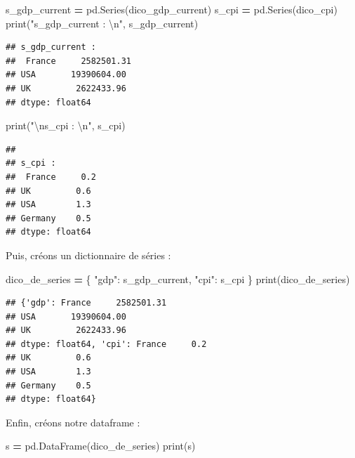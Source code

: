 \documentclass[12pt,]{book}
\newenvironment{Shaded}{\begin{snugshade}}{\end{snugshade}}
\newcommand{\CharTok}[1]{\textcolor[rgb]{0.31,0.60,0.02}{#1}}
\newcommand{\StringTok}[1]{\textcolor[rgb]{0.31,0.60,0.02}{#1}}
\newcommand{\OperatorTok}[1]{\textcolor[rgb]{0.81,0.36,0.00}{\textbf{#1}}}
\newcommand{\BuiltInTok}[1]{#1}
\newcommand{\NormalTok}[1]{#1}
\numberwithin{equation}{section}
\numberwithin{countremarque}{section}
\begin{document}
\begin{Shaded}
\begin{Highlighting}[]
\NormalTok{s_gdp_current }\OperatorTok{=}\NormalTok{ pd.Series(dico_gdp_current)}
\NormalTok{s_cpi }\OperatorTok{=}\NormalTok{ pd.Series(dico_cpi)}
\BuiltInTok{print}\NormalTok{(}\StringTok{"s_gdp_current : }\CharTok{\textbackslash{}n}\StringTok{"}\NormalTok{, s_gdp_current)}
\end{Highlighting}
\end{Shaded}

\begin{lstlisting}
## s_gdp_current : 
##  France     2582501.31
## USA       19390604.00
## UK         2622433.96
## dtype: float64
\end{lstlisting}

\begin{Shaded}
\begin{Highlighting}[]
\BuiltInTok{print}\NormalTok{(}\StringTok{"}\CharTok{\textbackslash{}n}\StringTok{s_cpi : }\CharTok{\textbackslash{}n}\StringTok{"}\NormalTok{, s_cpi)}
\end{Highlighting}
\end{Shaded}

\begin{lstlisting}
## 
## s_cpi : 
##  France     0.2
## UK         0.6
## USA        1.3
## Germany    0.5
## dtype: float64
\end{lstlisting}

Puis, créons un dictionnaire de séries :

\begin{Shaded}
\begin{Highlighting}[]
\NormalTok{dico_de_series }\OperatorTok{=}\NormalTok{ \{}
    \StringTok{"gdp"}\NormalTok{: s_gdp_current,}
    \StringTok{"cpi"}\NormalTok{: s_cpi}
\NormalTok{\}}
\BuiltInTok{print}\NormalTok{(dico_de_series)}
\end{Highlighting}
\end{Shaded}

\begin{lstlisting}
## {'gdp': France     2582501.31
## USA       19390604.00
## UK         2622433.96
## dtype: float64, 'cpi': France     0.2
## UK         0.6
## USA        1.3
## Germany    0.5
## dtype: float64}
\end{lstlisting}

Enfin, créons notre dataframe :

\begin{Shaded}
\begin{Highlighting}[]
\NormalTok{s }\OperatorTok{=}\NormalTok{ pd.DataFrame(dico_de_series)}
\BuiltInTok{print}\NormalTok{(s)}
\end{Highlighting}
\end{Shaded}
\end{document}
